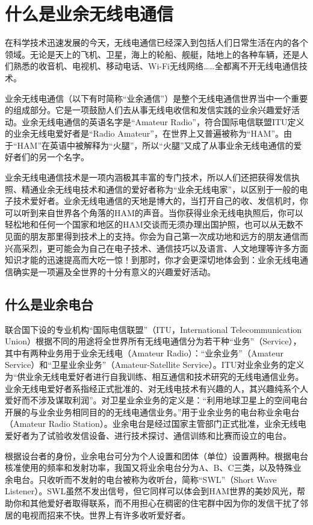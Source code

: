 \documentclass[12pt,UTF8]{ctexbook}
\begin{document}
\chapter{什么是业余无线电通信}

在科学技术迅速发展的今天，无线电通信已经深入到包括人们日常生活在内的各个领域。无论是天上的飞机、卫星，海上的轮船、舰艇，陆地上的各种车辆，还是人们熟悉的收音机、电视机、移动电话、Wi-Fi无线网络……全都离不开无线电通信技术。

业余无线电通信（以下有时简称“业余通信”）是整个无线电通信世界当中一个重要的组成部分。它是一项鼓励人们去从事无线电收信和发信实践的业余兴趣爱好活动。业余无线电通信的英语名字是“Amateur Radio”，符合国际电信联盟ITU定义的业余无线电爱好者是“Radio Amateur”，在世界上又普遍被称为“HAM”。由于“HAM”在英语中被解释为“火腿”，所以“火腿”又成了从事业余无线电通信的爱好者们的另一个名字。

业余无线电通信技术是一项内涵极其丰富的专门技术，所以人们还把获得发信执照、精通业余无线电技术和通信的爱好者称为“业余无线电家”，以区别于一般的电子技术爱好者。业余无线电通信的天地是博大的，当打开自己的收、发信机时，你可以听到来自世界各个角落的HAM的声音。当你获得业余无线电执照后，你可以轻松地和任何一个国家和地区的HAM交谈而无须办理出国护照，也可以从无数不见面的朋友那里得到技术上的支持。你会为自己第一次成功地和远方的朋友通信而兴高采烈，更可能会为自己在电子技术、通信技巧以及语言、人文地理等许多方面知识才能的迅速提高而大吃一惊！到那时，你才会更深切地体会到：业余无线电通信确实是一项遍及全世界的十分有意义的兴趣爱好活动。

\section{什么是业余电台}

联合国下设的专业机构“国际电信联盟”（ITU，International Telecommunication Union）根据不同的用途将全世界所有无线电通信分为若干种“业务”（Service），其中有两种业务用于业余无线电（Amateur Radio）：“业余业务”（Amateur Service）和“卫星业余业务”（Amateur-Satellite Service）。ITU对业余业务的定义为“供业余无线电爱好者进行自我训练、相互通信和技术研究的无线电通信业务。业余无线电爱好者系指经正式批准的、对无线电技术有兴趣的人，其兴趣纯系个人爱好而不涉及谋取利润”。对卫星业余业务的定义是：“利用地球卫星上的空间电台开展的与业余业务相同目的的无线电通信业务。”用于业余业务的电台称业余电台（Amateur Radio Station）。业余电台是经过国家主管部门正式批准，业余无线电爱好者为了试验收发信设备、进行技术探讨、通信训练和比赛而设立的电台。

根据设台者的身份，业余电台可分为个人设置和团体（单位）设置两种。根据电台核准使用的频率和发射功率，我国又将业余电台分为A、B、C三类，以及特殊业余电台。只收听而不发射的电台被称为收听台，简称“SWL”（Short Wave Listener）。SWL虽然不发出信号，但它同样可以体会到HAM世界的美妙风光，帮助你和其他爱好者取得联系，而不用担心在稠密的住宅群中因为你的发信干扰了邻居的电视而招来不快。世界上有许多收听爱好者。
\end{document}
